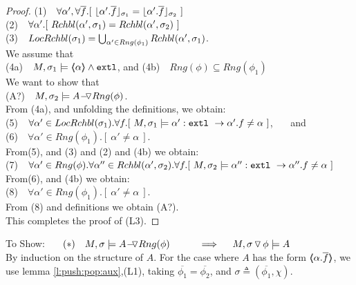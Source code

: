 \begin{proof}
\SP (1)\ \ $\forall \alpha',\forall \overline f.[\  \interpret {\sigma_1} {\alpha'.\overline f} =  \interpret {\sigma_2} {\alpha'.\overline f}\ ]$\\
\SP (2)\ \ $\forall \alpha'.[\  \Relevant {\alpha'} {\sigma_1} = \Relevant {\alpha'} {\sigma_2}\ ]$\\
\SP (3)\ \ $\LRelevantO {\sigma_1} = \bigcup_{\alpha'\in Rng(\phi_1)} \Relevant {\alpha'} {\sigma_1}$.\\
We   assume that\\
\SP (4a)\ \  $M, \sigma_1 \models \inside \alpha \wedge \extThis$, and
\SP (4b)\ \ $Rng(\phi) \subseteq Rng(\phi_1)$\\
We  want to show that\\
\SP (A?)\ \ $M, \sigma_2 \models \PushASLong  {Rng(\phi)} {A}$.\\
From (4a), and unfolding the definitions, we obtain:\\
\SP (5)\ \  $\forall \alpha'\in \LRelevantO {\sigma_1}.\forall f.[ \   M, \sigma_1 \models \alpha':\prg{extl}\ \rightarrow \alpha'.f  \neq \alpha\ ]$, \ \ \ and\\
\SP (6)\ \ $\forall \alpha'\in Rng (\phi_1). [ \ \alpha'\neq \alpha \ ]$.\\
From(5), and   (3) and (2) and (4b) we obtain:
\\
\SP (7)\ \  $\forall \alpha'\in Rng(\phi).\forall \alpha'' \in\Relevant {\alpha'} {\sigma_2}.\forall f.[ \   M, \sigma_2 \models \alpha'':\prg{extl}\ \rightarrow \alpha''.f  \neq \alpha\ ]$ \\
From(6), and   (4b) we obtain:
\\
\SP (8)\ \ $\forall \alpha'\in Rng (\phi_1). [ \ \alpha'\neq \alpha \ ]$.\\
From (8) and definitions we obtain (A?).\\
This completes the proof of (L3). 

\end{proof}


$~$ \\
To Show: \ \ \  $(*)\ \ \ M, \sigma \models \PushASLong  {Rng(\phi)} {A}\  \ \ \ \ \  \ \ \    \Longrightarrow  \ \ \ \ M,  \PushSLong {\phi} {\sigma}   \models A$
\\ $~$ \\
 By  induction on the structure of $A$. For the case where $A$ has the form $\inside {\alpha.\overline f}$, we use lemma \ref{l:push:pop:aux},(L1), taking $\overline {\phi_1} = \overline { \phi_2}$, and $\sigma \triangleq (\overline {\phi_1},\chi).$
\\
\completeProofSub
 

